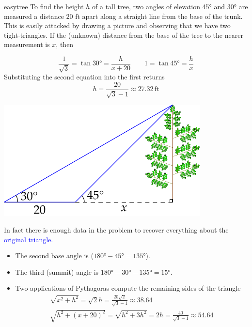 \begin{example}{}{easytree}
To find the height $h$ of a tall tree, two angles of elevation \ang{45} and \ang{30} are measured a distance 20 ft apart along a straight line from the base of the trunk.\smallbreak
This is easily attacked by drawing a picture and observing that we have two tight-triangles. If the (unknown) distance from the base of the tree to the nearer measurement is $x$, then\par
\begin{minipage}[t]{0.54\linewidth}\vspace{-7pt}
\[\frac 1{\sqrt 3}=\tan\ang{30}=\frac h{x+20}\qquad 1=\tan\ang{45}=\frac hx\]
Substituting the second equation into the first returns
\[h=\frac{20}{\sqrt 3-1}\approx 27.32\,\text{ft}\]
\end{minipage}\hfill\begin{minipage}[t]{0.45\linewidth}\vspace{-12pt}
\flushright\includegraphics{tree2}
\end{minipage}\smallbreak
In fact there is enough data in the problem to recover everything about the \textcolor{blue}{original triangle.}
\begin{itemize}\itemsep2pt
  \item The second base angle is ($\ang{180}-\ang{45}=\ang{135}$).
  \item The third (summit) angle is $\ang{180}-\ang{30}-\ang{135}=\ang{15}$.
  \item Two applications of Pythagoras compute the remaining sides of the triangle
  \begin{gather*}
  \sqrt{x^2+h^2}=\sqrt 2h=\frac{20\sqrt 2}{\sqrt 3-1}\approx 38.64\\
  \sqrt{h^2+(x+20)^2}=\sqrt{h^2+3h^2}=2h=\frac{40}{\sqrt 3-1}\approx 54.64
  \end{gather*}
\end{itemize}
\end{example}

